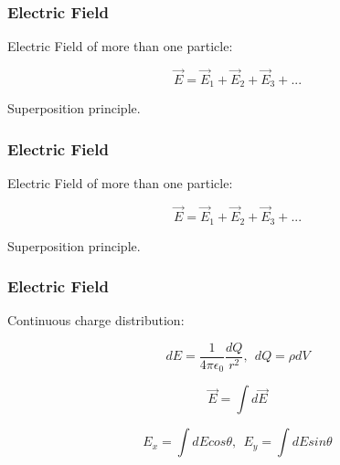 \documentclass[]{beamer}
\begin{document}




\begin{frame}
\frametitle{Electric Field}

Electric Field of more than one particle:
\pause
\vspace{3mm}



\begin{equation}
\vec{E}=\vec{E}_1+\vec{E}_2+\vec{E}_3+...
\end{equation}

\pause
\vspace{3mm}

Superposition principle.

  \end{frame}






\begin{frame}
\frametitle{Electric Field}

Electric Field of more than one particle:
\pause
\vspace{3mm}



\begin{equation}
\vec{E}=\vec{E}_1+\vec{E}_2+\vec{E}_3+...
\end{equation}

\pause
\vspace{3mm}

Superposition principle.

  \end{frame}






\begin{frame}
\frametitle{Electric Field}

Continuous charge distribution:

\pause

\begin{equation}
dE=\frac{1}{4\pi\epsilon_0}\frac{dQ}{r^2}, \ \ dQ=\rho dV
\end{equation}
\pause

\begin{equation}
\vec{E}=\int d\vec{E}
\end{equation}
\pause

\begin{equation}
E_x=\int dE cos\theta, \ \ E_y=\int dE sin\theta
\end{equation}

  \end{frame}
\end{document}
